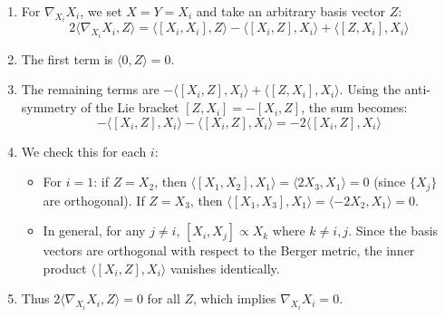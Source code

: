 \begin{solution}
\begin{enumerate}
    \begin{equation*}
        2\langle \nabla_X Y, Z \rangle = \langle [X, Y], Z \rangle - \langle [Y, Z], X \rangle + \langle [Z, X], Y \rangle
    \end{equation*}
    \item For $\nabla_{X_i} X_i$, we set $X = Y = X_i$ and take an arbitrary basis vector $Z$:
    \begin{equation*}
        2\langle \nabla_{X_i} X_i, Z \rangle = \langle [X_i, X_i], Z \rangle - \langle [X_i, Z], X_i \rangle + \langle [Z, X_i], X_i \rangle
    \end{equation*}
    \item The first term is $\langle 0, Z \rangle = 0$. 
    \item The remaining terms are $-\langle [X_i, Z], X_i \rangle + \langle [Z, X_i], X_i \rangle$. Using the anti-symmetry of the Lie bracket $[Z, X_i] = -[X_i, Z]$, the sum becomes:
    \begin{equation*}
        -\langle [X_i, Z], X_i \rangle - \langle [X_i, Z], X_i \rangle = -2\langle [X_i, Z], X_i \rangle
    \end{equation*}
    \item We check this for each $i$:
    \begin{itemize}
        \item For $i=1$: if $Z=X_2$, then $\langle [X_1, X_2], X_1 \rangle = \langle 2X_3, X_1 \rangle = 0$ (since $\{X_j\}$ are orthogonal). If $Z=X_3$, then $\langle [X_1, X_3], X_1 \rangle = \langle -2X_2, X_1 \rangle = 0$.
        \item In general, for any $j \neq i$, $[X_i, X_j] \propto X_k$ where $k \neq i, j$. Since the basis vectors are orthogonal with respect to the Berger metric, the inner product $\langle [X_i, Z], X_i \rangle$ vanishes identically.
    \end{itemize}
    \item Thus $2\langle \nabla_{X_i} X_i, Z \rangle = 0$ for all $Z$, which implies $\nabla_{X_i} X_i = 0$.
\end{enumerate}


\end{solution}
